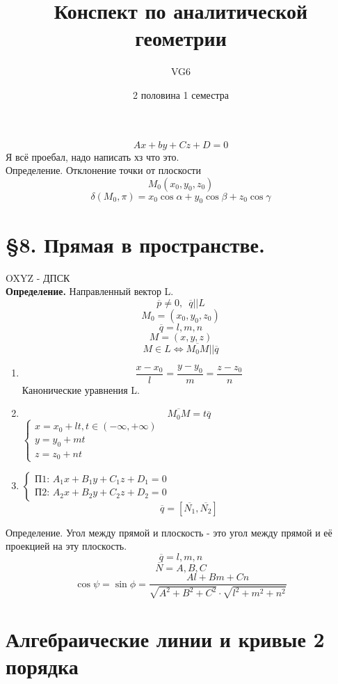 \documentclass[12pt, a4paper]{article}
\title{Конспект по аналитической геометрии}
\author{VG6}
\date{2 половина 1 семестра}
\begin{document}
\maketitle
\tableofcontents
\newpage

\[ Ax + by + Cz + D = 0 \]
\[  \]
Я всё проебал, надо написать хз что это.\\
Определение. Отклонение точки от плоскости
\[ M_0 (x_0, y_0, z_0) \]
\[ \delta (M_0, \pi) = x_0 \cos \alpha + y_0 \cos \beta + z_0 \cos \gamma \]

\section{ \S 8. Прямая в пространстве. }
OXYZ - ДПСК\\
\textbf{Определение.} Направленный вектор L.
\[\overline{p} \not= 0,\;\ \overline{q} || L\]
\[ M_0 = (x_0, y_0, z_0) \]
\[
	\overline{q} = {l, m, n}\]
\[
	M = (x, y, z)\]
	\[ M \in L \Leftrightarrow \overline{M_0M} || \overline{q} \]
	\begin{enumerate}
		\item \[ \frac{x-x_0}{l} = \frac{y - y_0}{m} = \frac{z-z_0}{n} \]
	Канонические уравнения L.
		\item \[ \overline{M_0M} = t \overline{q} \]
			$ \begin{cases}
				x = x_0 + lt, t \in (-\infty , +\infty)\\
				y = y_0 + mt\\
				z = z_0 + nt
			\end{cases} $
		\item $ \begin{cases}
			\text{П1: }A_1x + B_1y + C_1z + D_1 = 0\\
			\text{П2: }A_2x + B_2y + C_2z + D_2 = 0
		\end{cases} $
	\[ \overline{q} = [ \overline{N_1}, \overline{N_2} ] \]
	\end{enumerate}
 
	Определение. Угол между прямой и плоскость - это угол между прямой и её проекцией на эту плоскость.
	\[ \overline{q} = {l, m, n} \]
	\[ \overline{N} = {A, B, C} \]
	\[ \cos \psi = \sin \phi = \frac{Al + Bm + Cn}{\sqrt{A^2 + B^2 + C^2} \cdot \sqrt{l^2 + m^2 + n ^2}} \]
\section{Алгебраические линии и кривые 2 порядка}
\end{document}
